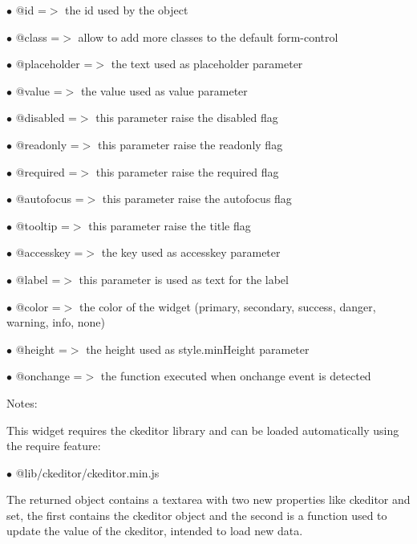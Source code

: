 \documentclass[a4paper]{article}
\begin{document}
\begin{compactitem}
\item[\color{myblue}$\bullet$] @id          =$>$ the id used by the object
\item[\color{myblue}$\bullet$] @class       =$>$ allow to add more classes to the default form-control
\item[\color{myblue}$\bullet$] @placeholder =$>$ the text used as placeholder parameter
\item[\color{myblue}$\bullet$] @value       =$>$ the value used as value parameter
\item[\color{myblue}$\bullet$] @disabled    =$>$ this parameter raise the disabled flag
\item[\color{myblue}$\bullet$] @readonly    =$>$ this parameter raise the readonly flag
\item[\color{myblue}$\bullet$] @required    =$>$ this parameter raise the required flag
\item[\color{myblue}$\bullet$] @autofocus   =$>$ this parameter raise the autofocus flag
\item[\color{myblue}$\bullet$] @tooltip     =$>$ this parameter raise the title flag
\item[\color{myblue}$\bullet$] @accesskey   =$>$ the key used as accesskey parameter
\item[\color{myblue}$\bullet$] @label       =$>$ this parameter is used as text for the label
\item[\color{myblue}$\bullet$] @color       =$>$ the color of the widget (primary, secondary, success, danger, warning, info, none)
\item[\color{myblue}$\bullet$] @height      =$>$ the height used as style.minHeight parameter
\item[\color{myblue}$\bullet$] @onchange    =$>$ the function executed when onchange event is detected
\end{compactitem}

Notes:

This widget requires the ckeditor library and can be loaded automatically using the require
feature:

\begin{compactitem}
\item[\color{myblue}$\bullet$] @lib/ckeditor/ckeditor.min.js
\end{compactitem}

The returned object contains a textarea with two new properties like ckeditor and set,
the first contains the ckeditor object and the second is a function used to update the
value of the ckeditor, intended to load new data.
\end{document}
